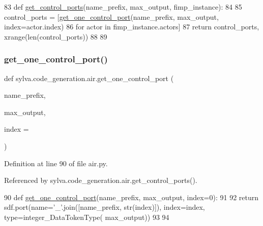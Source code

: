 \begin{DoxyCode}
83 \textcolor{keyword}{def }\hyperlink{namespacesylva_1_1code__generation_1_1air_a71d379169f113b29c326aa9f70c6d47e}{get\_control\_ports}(name\_prefix, max\_output, fimp\_instance):
84 
85     control\_ports = [\hyperlink{namespacesylva_1_1code__generation_1_1air_aab89db05c96a30b48a7afc9c857af6d7}{get\_one\_control\_port}(name\_prefix, max\_output, index=actor.index)
86                      \textcolor{keywordflow}{for} actor \textcolor{keywordflow}{in} fimp\_instance.actors]
87     \textcolor{keywordflow}{return} control\_ports, xrange(len(control\_ports))
88 
89 
\end{DoxyCode}
\mbox{\label{namespacesylva_1_1code__generation_1_1air_aab89db05c96a30b48a7afc9c857af6d7}} 
\subsubsection{\texorpdfstring{get\+\_\+one\+\_\+control\+\_\+port()}{get\_one\_control\_port()}}
{\footnotesize\ttfamily def sylva.\+code\+\_\+generation.\+air.\+get\+\_\+one\+\_\+control\+\_\+port (\begin{DoxyParamCaption}\item[{}]{name\+\_\+prefix,  }\item[{}]{max\+\_\+output,  }\item[{}]{index = {} }\end{DoxyParamCaption})}



Definition at line 90 of file air.\+py.



Referenced by sylva.\+code\+\_\+generation.\+air.\+get\+\_\+control\+\_\+ports().


\begin{DoxyCode}
90 \textcolor{keyword}{def }\hyperlink{namespacesylva_1_1code__generation_1_1air_aab89db05c96a30b48a7afc9c857af6d7}{get\_one\_control\_port}(name\_prefix, max\_output, index=0):
91 
92     \textcolor{keywordflow}{return} sdf.port(name=\textcolor{stringliteral}{'\_'}.join([name\_prefix, str(index)]), index=index, type=integer\_DataTokenType(
      max\_output))
93 
94 
\end{DoxyCode}
\mbox{\label{namespacesylva_1_1code__generation_1_1air_aaa165d9fb26a2af721734a446b1549fa}} 
